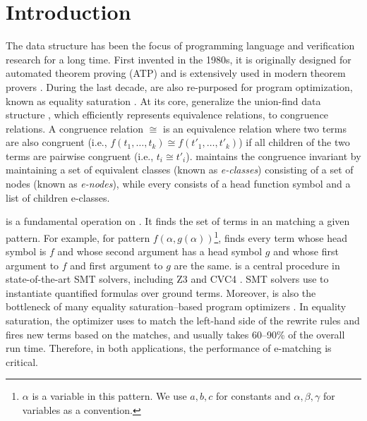 
\chapter {Introduction}

The \egraph data structure has been the focus of programming language and verification research for a long time. 
First invented in the 1980s, it is originally designed for automated theorem proving (ATP) and is extensively used in modern theorem provers \citep{eqsatthesis, efficient-ematching, proof-producing,simplify,Z3,CVC4}. 
During the last decade, \egraphs are also re-purposed for program optimization, known as equality saturation \citep{eqsat, denaili, spores, semsearch,herbie, egg}. 
At its core, \egraphs generalize the union-find data structure \citep{tarjan}, which efficiently represents equivalence relations, to congruence relations. 
A congruence relation $\cong$  is an equivalence relation where two terms are also congruent  (i.e., $f(t_1,\ldots,t_k)\cong f(t'_1,\ldots,t'_k)$) if all children of the two terms are pairwise congruent (i.e., $t_i\cong t'_i$). 
\Egraphs maintains the congruence invariant by maintaining a set of equivalent classes (known as \textit{e-classes}) consisting of a set of nodes (known as \textit{e-nodes}), while every \enode consists of a head function symbol and a list of children e-classes.

\Ematching is a fundamental operation on \egraphs \citep{efficient-ematching, simplify}. 
It finds the set of terms in an \egraph matching a given pattern. 
For example, for pattern $f(\alpha, g(\alpha))$\footnote{
 $\alpha$ is a variable in this pattern. We use $a,b,c$ for constants and $\alpha, \beta, \gamma$ for variables as a convention.
}, \ematching finds every term whose head symbol is $f$ and whose second argument has a head symbol $g$ and whose first argument to $f$ and first argument to $g$ are the same.
\Ematching is a central procedure in state-of-the-art SMT solvers, including \textsc{Z3} \citep{Z3} and \textsc{CVC4} \citep{CVC4}. SMT solvers use \ematching to instantiate quantified formulas over ground terms. Moreover, \ematching is also the bottleneck of many equality saturation--based program optimizers \citep{spores,herbie,egg}. In equality saturation, the optimizer uses \ematching to match the left-hand side of the rewrite rules and fires new terms based on the matches, and \ematching usually takes 60--90\% of the overall run time.
Therefore, in both applications, the performance of e-matching is critical.

